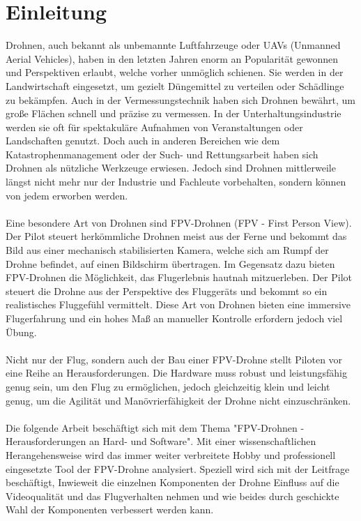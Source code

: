 
\section[Einleitung]{Einleitung}
    Drohnen, auch bekannt als unbemannte Luftfahrzeuge oder UAVs (Unmanned Aerial Vehicles), haben in den letzten Jahren enorm an Popularität gewonnen und Perspektiven erlaubt, welche vorher unmöglich schienen. Sie werden in der Landwirtschaft eingesetzt, um gezielt Düngemittel zu verteilen oder Schädlinge zu bekämpfen. Auch in der Vermessungstechnik haben sich Drohnen bewährt, um große Flächen schnell und präzise zu vermessen. In der Unterhaltungsindustrie werden sie oft für spektakuläre Aufnahmen von Veranstaltungen oder Landschaften genutzt. Doch auch in anderen Bereichen wie dem Katastrophenmanagement oder der Such- und Rettungsarbeit haben sich Drohnen als nützliche Werkzeuge erwiesen. Jedoch sind Drohnen mittlerweile längst nicht mehr nur der Industrie und Fachleute vorbehalten, sondern können von jedem erworben werden.
    \\ \\
    Eine besondere Art von Drohnen sind FPV-Drohnen (FPV - First Person View). Der Pilot steuert herkömmliche Drohnen meist aus der Ferne und bekommt das Bild aus einer mechanisch stabilisierten Kamera, welche sich am Rumpf der Drohne befindet, auf einen Bildschirm übertragen. Im Gegensatz dazu bieten FPV-Drohnen die Möglichkeit, das Flugerlebnis hautnah mitzuerleben. Der Pilot steuert die Drohne aus der Perspektive des Fluggeräts und bekommt so ein realistisches Fluggefühl vermittelt. Diese Art von Drohnen bieten eine immersive Flugerfahrung und ein hohes Maß an manueller Kontrolle erfordern jedoch viel Übung.
    \\ \\
    Nicht nur der Flug, sondern auch der Bau einer FPV-Drohne stellt Piloten vor eine Reihe an Herausforderungen. Die Hardware muss robust und leistungsfähig genug sein, um den Flug zu ermöglichen, jedoch gleichzeitig klein und leicht genug, um die Agilität und Manövrierfähigkeit der Drohne nicht einzuschränken.
    \\ \\
    Die folgende Arbeit beschäftigt sich mit dem Thema "FPV-Drohnen - Herausforderungen an Hard- und Software". Mit einer wissenschaftlichen Herangehensweise wird das immer weiter verbreitete Hobby und professionell eingesetzte Tool der FPV-Drohne analysiert. Speziell wird sich mit der Leitfrage beschäftigt, Inwieweit die einzelnen Komponenten der Drohne Einfluss auf die Videoqualität und das Flugverhalten nehmen und wie beides durch geschickte Wahl der Komponenten verbessert werden kann.
